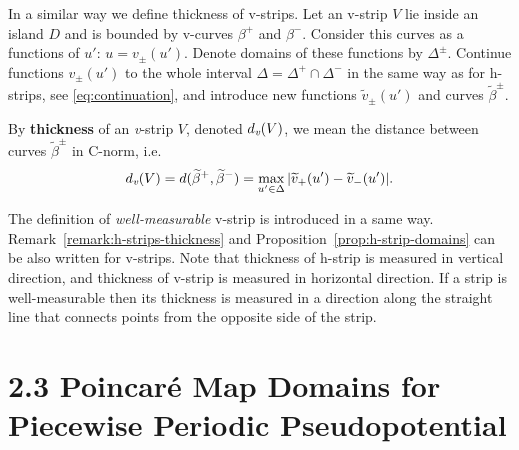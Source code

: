 In a similar way we define thickness of v-strips.
Let an v-strip $V$ lie inside an island $D$ and is bounded by v-curves $\beta^+$ and $\beta^-$.
Consider this curves as a functions of $u'$: $u = v_{\pm}(u')$.
Denote domains of these functions by $\Delta^{\pm}$.
Continue functions $v_{\pm}(u')$ to the whole interval $\Delta = \Delta^+ \cap \Delta^-$ in the same way as for h-strips, see \eqref{eq:continuation}, and introduce new functions $\widetilde{v}_{\pm}(u')$ and curves $\widetilde{\beta}^{\pm}$.

\begin{definition}
\label{def:v-thickness}
	By {\bf thickness} of an \emph{v}-strip $V$, denoted $d_\emph{v}(V)$, we mean the distance between curves $\widetilde{\beta}^{\pm}$ in C-norm, i.e.
	\begin{equation}
		d_\emph{v}(V) = d(\widetilde{\beta}^+, \widetilde{\beta}^-) = \max \limits_{u' \in \Delta} |\widetilde{v}_+(u') - \widetilde{v}_-(u')|.
	\label{eq:v-thickness}
	\end{equation}
\end{definition}

The definition of {\it well-measurable} v-strip is introduced in a same way.
Remark~\ref{remark:h-strips-thickness} and Proposition~\ref{prop:h-strip-domains} can be also written for v-strips.
Note that thickness of h-strip is measured in vertical direction, and thickness of v-strip is measured in horizontal direction.
If a strip is well-measurable then its thickness is measured in a direction along the straight line that connects points from the opposite side of the strip.

\section*{2.3 Poincar\'e Map Domains for Piecewise Periodic Pseudopotential}
\label{section:poincare-map-domains-piecewise}

